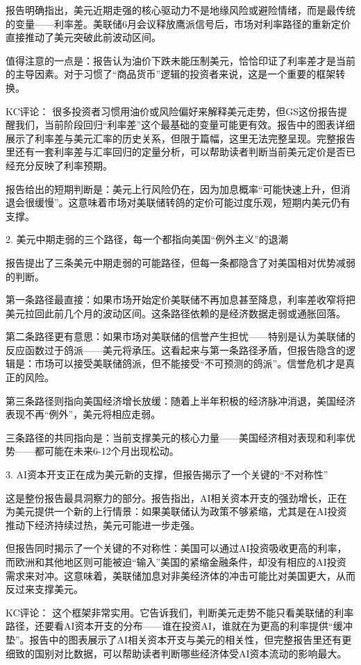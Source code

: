 \documentclass[11pt]{ctexart}
\begin{document}
报告明确指出，美元近期走强的核心驱动力不是地缘风险或避险情绪，而是最传统的变量——利率差。美联储6月会议释放鹰派信号后，市场对利率路径的重新定价直接推动了美元突破此前波动区间。

值得注意的一点是：报告认为油价下跌未能压制美元，恰恰印证了利率差才是当前的主导因素。对于习惯了“商品货币”逻辑的投资者来说，这是一个重要的框架转换。

KC评论： 很多投资者习惯用油价或风险偏好来解释美元走势，但GS这份报告提醒我们，当前阶段回归“利率差”这个最基础的变量可能更有效。报告中的图表详细展示了利率差与美元汇率的历史关系，但限于篇幅，这里无法完整呈现。完整报告里还有一套利率差与汇率回归的定量分析，可以帮助读者判断当前美元定价是否已经充分反映了利率预期。

报告给出的短期判断是：美元上行风险仍在，因为加息概率“可能快速上升，但消退会很缓慢”。这意味着市场对美联储转鸽的定价可能过度乐观，短期内美元仍有支撑。

2. 美元中期走弱的三个路径，每一个都指向美国“例外主义”的退潮

报告提出了三条美元中期走弱的可能路径，但每一条都隐含了对美国相对优势减弱的判断。

第一条路径最直接：如果市场开始定价美联储不再加息甚至降息，利率差收窄将把美元拉回此前几个月的波动区间。这条路径依赖的是经济数据走弱或通胀回落。

第二条路径更有意思：如果市场对美联储的信誉产生担忧——特别是认为美联储的反应函数过于鸽派——美元将承压。这看起来与第一条路径矛盾，但报告隐含的逻辑是：市场可以接受美联储鸽派，但不能接受“不可预测的鸽派”。信誉危机才是真正的风险。

第三条路径则指向美国经济增长放缓：随着上半年积极的经济脉冲消退，美国经济表现不再“例外”，美元将相应走弱。

三条路径的共同指向是：当前支撑美元的核心力量——美国经济相对表现和利率优势——都可能在未来6-12个月出现松动。

3. AI资本开支正在成为美元新的支撑，但报告揭示了一个关键的“不对称性”

这是整份报告最具洞察力的部分。报告指出，AI相关资本开支的强劲增长，正在为美元提供一个新的上行情景：如果美联储认为政策不够紧缩，尤其是在AI投资推动下经济持续过热，美元可能进一步走强。

但报告同时揭示了一个关键的不对称性：美国可以通过AI投资吸收更高的利率，而欧洲和其他地区则可能被迫“输入”美国的紧缩金融条件，却没有相应的AI投资需求来对冲。这意味着，美联储加息对非美经济体的冲击可能比对美国更大，从而反过来支撑美元。

KC评论： 这个框架非常实用。它告诉我们，判断美元走势不能只看美联储的利率路径，还要看AI资本开支的分布——谁在投资AI，谁就在为更高的利率提供“缓冲垫”。报告中的图表展示了AI相关资本开支与美元的相关性，但完整报告里还有更细致的国别对比数据，可以帮助读者判断哪些经济体受AI资本流动的影响最大。
\end{document}
